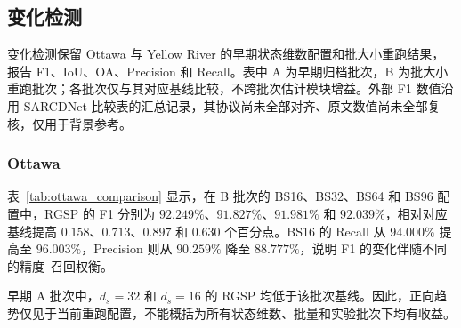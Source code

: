 \documentclass[journal]{IEEEtran}
\begin{document}
\FloatBarrier


\subsection{变化检测}
\label{sec:change_detection_results}

变化检测保留 Ottawa 与 Yellow River 的早期状态维数配置和批大小重跑结果，报告 F1、IoU、OA、Precision 和 Recall。表中 A 为早期归档批次，B 为批大小重跑批次；各批次仅与其对应基线比较，不跨批次估计模块增益。外部 F1 数值沿用 SARCDNet 比较表的汇总记录\cite{sarcdnet2026}，其协议尚未全部对齐、原文数值尚未全部复核，仅用于背景参考。

\subsubsection{Ottawa}
\label{sec:ottawa_results}

表~\ref{tab:ottawa_comparison} 显示，在 B 批次的 BS16、BS32、BS64 和 BS96 配置中，RGSP 的 F1 分别为 $92.249\%$、$91.827\%$、$91.981\%$ 和 $92.039\%$，相对对应基线提高 $0.158$、$0.713$、$0.897$ 和 $0.630$ 个百分点。BS16 的 Recall 从 $94.000\%$ 提高至 $96.003\%$，Precision 则从 $90.259\%$ 降至 $88.777\%$，说明 F1 的变化伴随不同的精度--召回权衡。

早期 A 批次中，$d_s=32$ 和 $d_s=16$ 的 RGSP 均低于该批次基线。因此，正向趋势仅见于当前重跑配置，不能概括为所有状态维数、批量和实验批次下均有收益。
\end{document}
